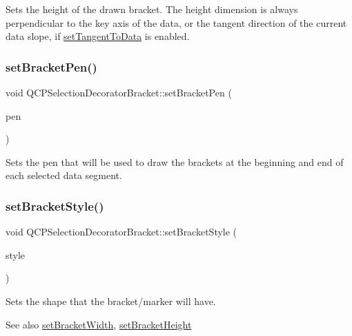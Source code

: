 Sets the height of the drawn bracket. The height dimension is always perpendicular to the key axis of the data, or the tangent direction of the current data slope, if \hyperlink{classQCPSelectionDecoratorBracket_a93bc6086e53a5e40a08641a7b2e2cdd5}{set\+Tangent\+To\+Data} is enabled. \mbox{\label{classQCPSelectionDecoratorBracket_ac0e392a6097990f8aa978932a8fa05d6}} 
\subsubsection{\texorpdfstring{set\+Bracket\+Pen()}{setBracketPen()}}
{\footnotesize\ttfamily void Q\+C\+P\+Selection\+Decorator\+Bracket\+::set\+Bracket\+Pen (\begin{DoxyParamCaption}\item[{const Q\+Pen \&}]{pen }\end{DoxyParamCaption})}

Sets the pen that will be used to draw the brackets at the beginning and end of each selected data segment. \mbox{\label{classQCPSelectionDecoratorBracket_a04507697438f6ad8cc2aeea5422dcbe5}} 
\subsubsection{\texorpdfstring{set\+Bracket\+Style()}{setBracketStyle()}}
{\footnotesize\ttfamily void Q\+C\+P\+Selection\+Decorator\+Bracket\+::set\+Bracket\+Style (\begin{DoxyParamCaption}\item[{\hyperlink{classQCPSelectionDecoratorBracket_aa6d18517ec0553575bbef0de4252336e}{Q\+C\+P\+Selection\+Decorator\+Bracket\+::\+Bracket\+Style}}]{style }\end{DoxyParamCaption})}

Sets the shape that the bracket/marker will have.

\begin{DoxySeeAlso}{See also}
\hyperlink{classQCPSelectionDecoratorBracket_a291b59cab98ce93a0a3c85963fe10f5e}{set\+Bracket\+Width}, \hyperlink{classQCPSelectionDecoratorBracket_aed773ad737201cca40efc6fe451acad8}{set\+Bracket\+Height} 
\end{DoxySeeAlso}
\mbox{\label{classQCPSelectionDecoratorBracket_a291b59cab98ce93a0a3c85963fe10f5e}} 
